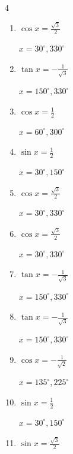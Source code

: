 \begin{multicols}{4}
\begin{enumerate}
        $\displaystyle x = 60^{\circ} , 240^{\circ}$

  \item $\displaystyle \cos{x}  = \frac{\sqrt{3}}{2}$

        $\displaystyle x = 30^{\circ} , 330^{\circ}$

  \item $\displaystyle \tan{x}  = -\frac{1}{\sqrt{3}}$

        $\displaystyle x = 150^{\circ} , 330^{\circ}$

  \item $\displaystyle \cos{x}  = \frac{1}{2}$

        $\displaystyle x = 60^{\circ} , 300^{\circ}$

  \item $\displaystyle \sin{x}  = \frac{1}{2}$

        $\displaystyle x = 30^{\circ} , 150^{\circ}$

  \item $\displaystyle \cos{x}  = \frac{\sqrt{3}}{2}$

        $\displaystyle x = 30^{\circ} , 330^{\circ}$

  \item $\displaystyle \cos{x}  = \frac{\sqrt{3}}{2}$

        $\displaystyle x = 30^{\circ} , 330^{\circ}$

  \item $\displaystyle \tan{x}  = -\frac{1}{\sqrt{3}}$

        $\displaystyle x = 150^{\circ} , 330^{\circ}$

  \item $\displaystyle \tan{x}  = -\frac{1}{\sqrt{3}}$

        $\displaystyle x = 150^{\circ} , 330^{\circ}$

  \item $\displaystyle \cos{x}  = -\frac{1}{\sqrt{2}}$

        $\displaystyle x = 135^{\circ} , 225^{\circ}$

\columnbreak %

\resetques

  \item $\displaystyle \sin{x}  = \frac{1}{2}$

        $\displaystyle x = 30^{\circ} , 150^{\circ}$

  \item $\displaystyle \sin{x}  = \frac{\sqrt{3}}{2}$


\end{enumerate}
\end{multicols}
